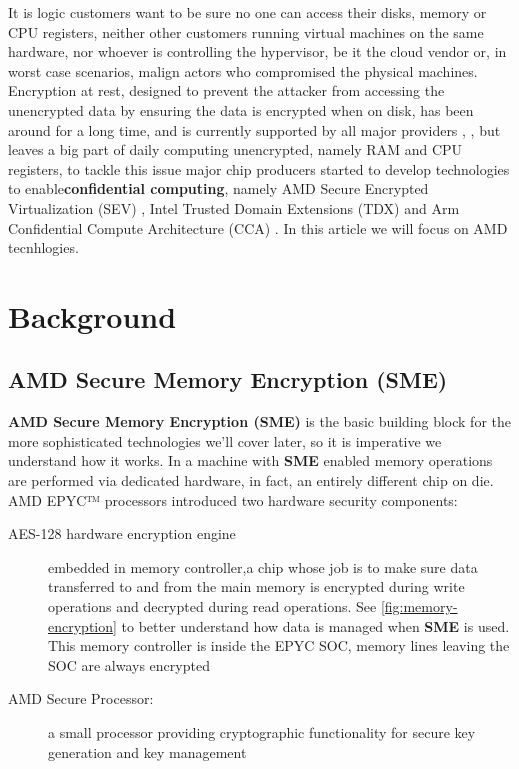 \documentclass[twocolumn]{article}
\begin{document}
It is logic customers want to be sure no one can access their disks, memory or CPU registers, neither other customers running virtual machines on the same hardware, nor whoever is controlling the hypervisor, be it  the cloud vendor  or, in worst case scenarios, malign actors who compromised the physical machines. Encryption at rest, designed to prevent the attacker from accessing the unencrypted data by ensuring the data is encrypted when on disk, has been around for a long time, and is currently supported by all major providers \cite{aws-enc}, \cite{gcp-enc}, \cite{azure-enc} but leaves a big part of daily computing unencrypted, namely RAM and CPU registers, to tackle this issue major chip producers started to develop technologies to enable\textbf{confidential computing}, namely AMD Secure Encrypted Virtualization (SEV) \cite{memory-encryption}, Intel Trusted Domain Extensions (TDX) \cite{tdx} and Arm Confidential Compute Architecture (CCA) \cite{cca}. In this article we will focus on AMD tecnhlogies.

\section{Background}
\subsection{AMD Secure Memory Encryption (SME)}

\textbf{AMD Secure Memory Encryption (SME)} is the basic building block for the more sophisticated technologies we'll cover later, so it is imperative we understand how it works. In a machine with \textbf{SME} enabled memory operations are performed via dedicated hardware, in fact, an entirely different chip on die. AMD EPYC™ processors introduced two hardware security components:

\begin{description}
    \item [AES-128 hardware encryption engine] embedded in memory controller,a chip whose job is to make sure data transferred to and from the main memory is encrypted during write operations and decrypted during read operations. See \ref{fig:memory-encryption} to better understand how data is managed when \textbf{SME} is used. This memory controller is inside the EPYC SOC, memory lines leaving the SOC are always encrypted
    \item [AMD Secure Processor:] a small processor providing cryptographic functionality for secure key generation and key management
\end{description}
\end{document}
